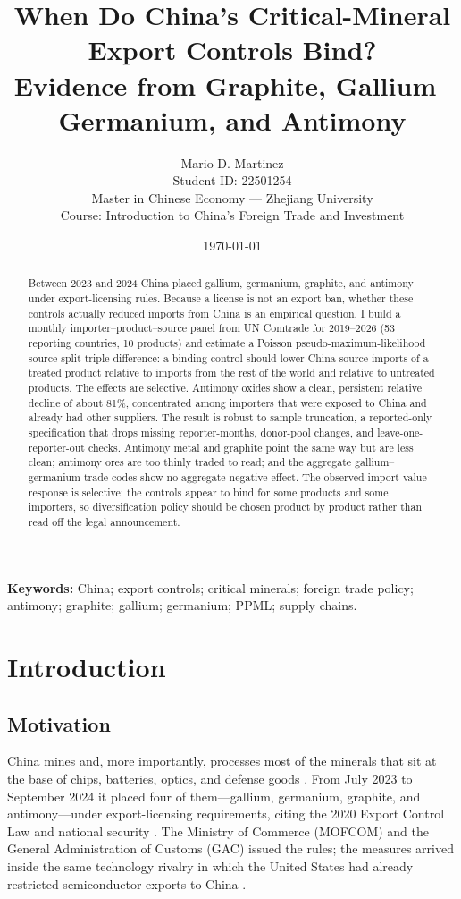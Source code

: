 \documentclass[12pt,a4paper]{article}
\title{\bfseries When Do China's Critical-Mineral Export Controls Bind?\\[4pt]
\large\normalfont Evidence from Graphite, Gallium--Germanium, and Antimony}
\author{Mario D. Martinez\\[2pt]
\small Student ID: 22501254\\
\small Master in Chinese Economy --- Zhejiang University\\
\small Course: Introduction to China's Foreign Trade and Investment}
\date{\today}
\begin{document}
\maketitle

\begin{abstract}
\noindent
Between 2023 and 2024 China placed gallium, germanium, graphite, and antimony
under export-licensing rules. Because a license is not an export ban, whether
these controls actually reduced imports from China is an empirical question. I
build a monthly importer--product--source panel from UN Comtrade for
2019--2026 (53 reporting countries, 10 products) and estimate a Poisson
pseudo-maximum-likelihood source-split triple difference: a binding control
should lower China-source imports of a treated product relative to imports from
the rest of the world and relative to untreated products. The effects are
selective. Antimony oxides show a clean, persistent relative decline of about
81\%, concentrated among importers that were exposed to China and already had
other suppliers. The result is robust to sample truncation, a reported-only
specification that drops missing reporter-months, donor-pool changes, and
leave-one-reporter-out checks. Antimony metal and graphite point the same way but are less
clean; antimony ores are too thinly traded to read; and the aggregate
gallium--germanium trade codes show no aggregate negative effect. The observed
import-value response is selective: the controls appear to bind for some products
and some importers, so diversification policy should be chosen product by product
rather than read off the legal announcement.
\end{abstract}

\medskip
\noindent\textbf{Keywords:} China; export controls; critical minerals; foreign
trade policy; antimony; graphite; gallium; germanium; PPML; supply chains.

\newpage
{\small
\setcounter{tocdepth}{1}
\tableofcontents
}
\newpage

\section{Introduction}\label{sec:intro}

\subsection{Motivation}

China mines and, more importantly, processes most of the minerals that sit at
the base of chips, batteries, optics, and defense goods
\citep{iea_2025_global_critical_minerals_outlook}. From July 2023 to September
2024 it placed four of them---gallium, germanium, graphite, and antimony---under
export-licensing requirements, citing the 2020 Export Control Law and national
security \citep{prc_2020_export_control_law}. The Ministry of Commerce (MOFCOM)
and the General Administration of Customs (GAC) issued the rules; the measures
arrived inside the same technology rivalry in which the United States had
already restricted semiconductor exports to China
\citep{bown-2020-howunitedstates, bown2024semiconductors}.
\end{document}
